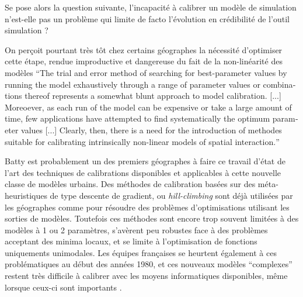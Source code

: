 Se pose alors la question suivante, l'incapacité à calibrer un modèle de simulation n'est-elle pas un problème qui limite de facto l'évolution en crédibilité de l'outil simulation ? 

On perçoit pourtant très tôt chez certains géographes la nécessité d'optimiser cette étape, rendue improductive et dangereuse du fait de la non-linéarité des modèles \foreignquote{english}{The trial and error method of searching for best-parameter values by running the model exhaustively through a range of parameter values or combinations thereof represents a somewhat blunt approach to model calibration. [...] Moreoever, as each run of the model can be expensive or take a large amount of time, few applications have attempted to find systematically the optimum parameter values [...] Clearly, then, there is a need for the introduction of methodes suitable for calibrating intrinsically non-linear models of spatial interaction.} \autocite[155]{Batty1976}

Batty est probablement un des premiers géographes à faire ce travail d'état de l'art des techniques de calibrations disponibles et applicables à cette nouvelle classe de modèles urbains. Des méthodes de calibration basées sur des méta-heuristiques de type descente de gradient, ou \textit{hill-climbing} sont déjà utilisées par les géographes comme \textcite[159-160]{Batty1976} pour résoudre des problèmes d'optimisations utilisant les sorties de modèles. Toutefois ces méthodes sont encore trop souvent limitées à des modèles à 1 ou 2 paramètres, s'avèrent peu robustes face à des problèmes acceptant des minima locaux, et se limite à l'optimisation de fonctions uniquements unimodales. Les équipes françaises se heurtent également à ces problématiques au début des années 1980, et ces nouveaux modèles \enquote{complexes} restent très difficile à calibrer avec les moyens informatiques disponibles, même lorsque ceux-ci sont importants \autocites{Pumain1983b, Sanders1984}.

